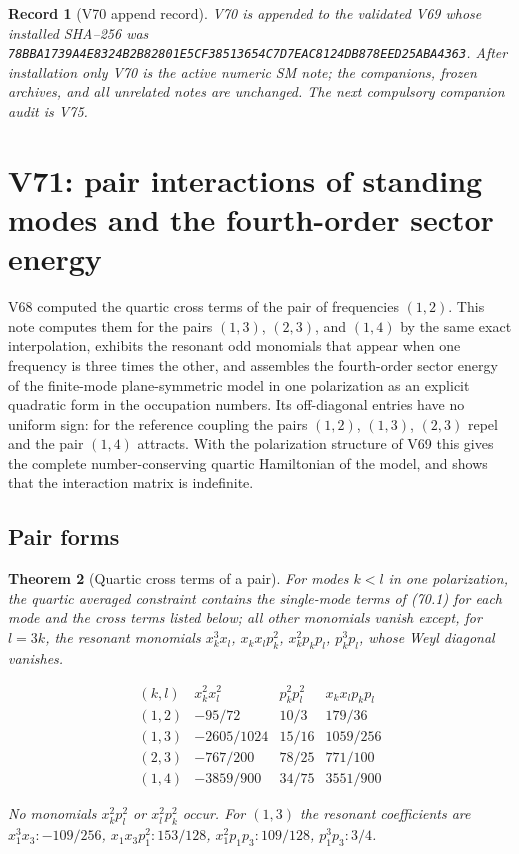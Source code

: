 \documentclass[11pt]{article}
\newtheorem{theorem}{Theorem}[section]
\newtheorem{record}[theorem]{Record}
\theoremstyle{remark}
\begin{document}
\begin{record}[V70 append record]
\label{rec:v19v70}
V70 is appended to the validated V69 whose installed SHA--256 was
\texttt{78BBA1739A4E8324B2B82801E5CF38513654C7D7EAC8124DB878EED25ABA4363}.
After installation only V70 is the active numeric SM note; the
companions, frozen archives, and all unrelated notes are unchanged.  The
next compulsory companion audit is V75.
\end{record}


\section{V71: pair interactions of standing modes and the fourth-order sector energy}
\label{sec:v19v71}

V68 computed the quartic cross terms of the pair of frequencies
\((1,2)\).  This note computes them for the pairs \((1,3)\), \((2,3)\),
and \((1,4)\) by the same exact interpolation, exhibits the resonant
odd monomials that appear when one frequency is three times the other,
and assembles the fourth-order sector energy of the finite-mode
plane-symmetric model in one polarization as an explicit quadratic
form in the occupation numbers.  Its off-diagonal entries have no
uniform sign: for the reference coupling the pairs \((1,2)\), \((1,3)\),
\((2,3)\) repel and the pair \((1,4)\) attracts.  With the polarization
structure of V69 this gives the complete number-conserving quartic
Hamiltonian of the model, and shows that the interaction matrix is
indefinite.

\subsection{Pair forms}

\begin{theorem}[Quartic cross terms of a pair]
\label{thm:v19v71-pairs}
For modes \(k<l\) in one polarization, the quartic averaged constraint
contains the single-mode terms of (70.1) for each mode and the cross
terms listed below; all other monomials vanish except, for \(l=3k\),
the resonant monomials \(x_k^3x_l\), \(x_kx_lp_k^2\), \(x_k^2p_kp_l\),
\(p_k^3p_l\), whose Weyl diagonal vanishes.

\[
\begin{array}{c|c|c|c}
(k,l)&x_k^2x_l^2&p_k^2p_l^2&x_kx_lp_kp_l\\ \hline
(1,2)&-95/72&10/3&179/36\\
(1,3)&-2605/1024&15/16&1059/256\\
(2,3)&-767/200&78/25&771/100\\
(1,4)&-3859/900&34/75&3551/900
\end{array}                                                            \tag{74.1}
\]

No monomials \(x_k^2p_l^2\) or \(x_l^2p_k^2\) occur.  For \((1,3)\) the
resonant coefficients are
\(x_1^3x_3:-109/256\), \(x_1x_3p_1^2:153/128\), \(x_1^2p_1p_3:109/128\),
\(p_1^3p_3:3/4\).
\end{theorem}
\end{document}

